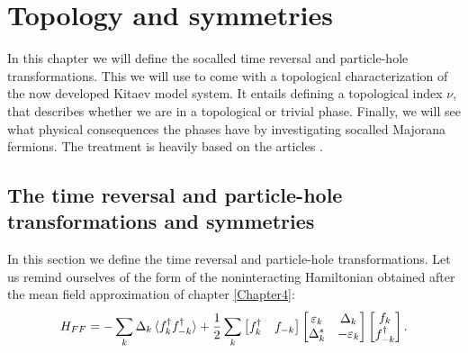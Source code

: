 
\chapter{Topology and symmetries} %

\label{Chapter7} %


In this chapter we will define the socalled time reversal and particle-hole transformations. This we will use to come with a topological characterization of the now developed Kitaev model system. It entails defining a topological index $\nu$, that describes whether we are in a topological or trivial phase. Finally, we will see what physical consequences the phases have by investigating socalled Majorana fermions. The treatment is heavily based on the articles \cite{Ludwig.Topology, Chiu.Topology, Alicea}. 

\section{The time reversal and particle-hole transformations and symmetries}
\label{sec.SymmetriesTRandPH}
In this section we define the time reversal and particle-hole transformations. Let us remind ourselves of the form of the noninteracting Hamiltonian obtained after the mean field approximation of chapter \ref{Chapter4}: 
\begin{equation}
H_{FF} = -\sum_k \Delta_k \braket {f^\dagger_k f^\dagger_{-k}} + \frac{1}{2}\sum_{k} \begin{bmatrix} f^\dagger_k & f_{-k} \end{bmatrix} \begin{bmatrix} \varepsilon_k & \Delta_k \\ \Delta^*_k & -\varepsilon_k \end{bmatrix} \begin{bmatrix} f_k \\ f^\dagger_{-k} \end{bmatrix}. \nonumber 
\end{equation}

